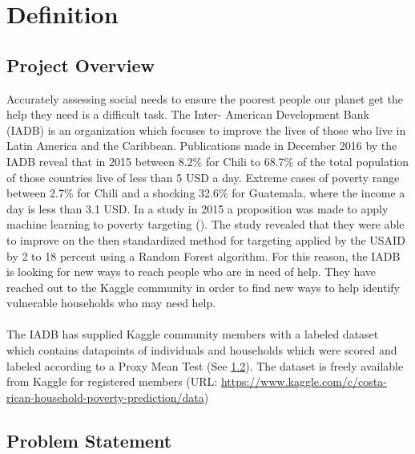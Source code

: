 \documentclass[preprint,12pt]{elsarticle}
\begin{document}
\section{Definition}
\label{S:1}

\subsection{Project Overview}

Accurately assessing social needs to ensure the poorest people our planet get the help they need is a difficult task. The Inter- American Development Bank (IADB) is an organization which focuses to improve the lives of those who live in Latin America and the Caribbean. Publications made in December 2016 by the IADB reveal that in 2015 between 8.2\% for Chili to 68.7\% of the total population of those countries live of less than 5 USD a day. Extreme cases of poverty range between 2.7\% for Chili and a shocking 32.6\% for Guatemala, where the income a day is less than 3.1 USD. In a study in 2015 a proposition was made to apply machine learning to poverty targeting (\citet{McBride:2015}). The study revealed that they were able to improve on the then standardized method for targeting applied by the USAID by 2 to 18 percent using a Random Forest algorithm. For this reason, the IADB is looking for new ways to reach people who are in need of help. They have reached out to the Kaggle community in order to find new ways to help identify vulnerable households who may need help.
\\
\\
The IADB has supplied Kaggle community members with a labeled dataset which contains datapoints of individuals and households which were scored and labeled according to a Proxy Mean Test (See \ref{ss:problem_statement}). The dataset is freely available from Kaggle for registered members (URL: \url{https://www.kaggle.com/c/costa-rican-household-poverty-prediction/data})

\subsection{Problem Statement}
\label{ss:problem_statement}
\end{document}
